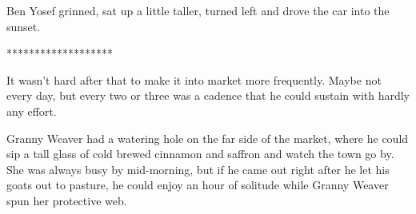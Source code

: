 \documentclass{amsart}
\begin{document}
Ben Yosef grinned, sat up a little taller, turned left and drove the car into the sunset.

\begin{center} ******************* \end{center} 

It wasn't hard after that to make it into market more frequently. Maybe not every day, but every two or three was a cadence that he could sustain with hardly any effort. 

Granny Weaver had a watering hole on the far side of the market, where he could sip a tall glass of cold brewed cinnamon and saffron and watch the town go by. She was always busy by mid-morning, but if he came out right after he let his goats out to pasture, he could enjoy an hour of solitude while Granny Weaver spun her protective web.
\end{document}
